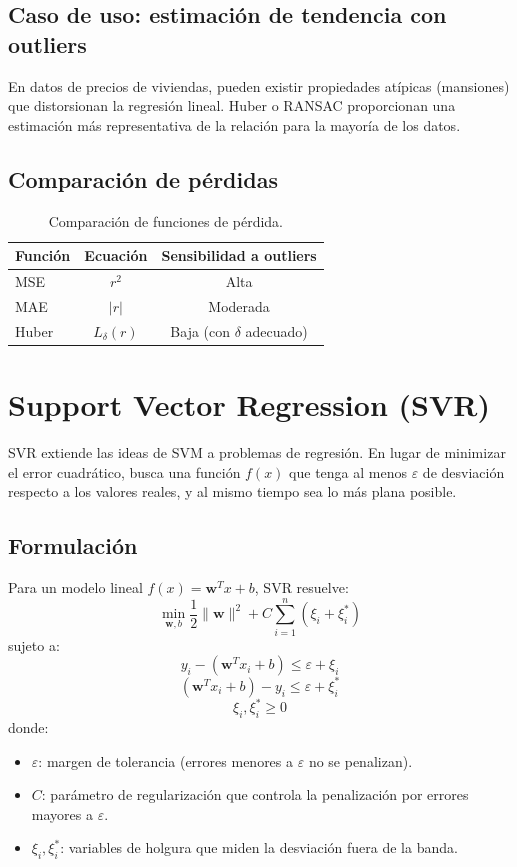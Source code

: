 \documentclass[12pt,a4paper,openany,oneside]{book}
\begin{document}
\subsection{Caso de uso: estimación de tendencia con outliers}
En datos de precios de viviendas, pueden existir propiedades atípicas (mansiones) que distorsionan la regresión lineal. Huber o RANSAC proporcionan una estimación más representativa de la relación para la mayoría de los datos.

\subsection{Comparación de pérdidas}
\begin{table}[h]
\centering
\begin{tabular}{|l|c|c|}
\hline
\textbf{Función} & \textbf{Ecuación} & \textbf{Sensibilidad a outliers} \\
\hline
MSE & \(r^2\) & Alta \\
MAE & \(|r|\) & Moderada \\
Huber & \(L_{\delta}(r)\) & Baja (con \(\delta\) adecuado) \\
\hline
\end{tabular}
\caption{Comparación de funciones de pérdida.}
\end{table}

\section{Support Vector Regression (SVR)}

SVR extiende las ideas de SVM a problemas de regresión. En lugar de minimizar el error cuadrático, busca una función \(f(x)\) que tenga al menos \(\varepsilon\) de desviación respecto a los valores reales, y al mismo tiempo sea lo más plana posible.

\subsection{Formulación}
Para un modelo lineal \(f(x) = \mathbf{w}^T x + b\), SVR resuelve:
\[
\min_{\mathbf{w}, b} \frac{1}{2} \|\mathbf{w}\|^2 + C \sum_{i=1}^n (\xi_i + \xi_i^*)
\]
sujeto a:
\[
y_i - (\mathbf{w}^T x_i + b) \le \varepsilon + \xi_i
\]
\[
(\mathbf{w}^T x_i + b) - y_i \le \varepsilon + \xi_i^*
\]
\[
\xi_i, \xi_i^* \ge 0
\]
donde:
\begin{itemize}
    \item \(\varepsilon\): margen de tolerancia (errores menores a \(\varepsilon\) no se penalizan).
    \item \(C\): parámetro de regularización que controla la penalización por errores mayores a \(\varepsilon\).
    \item \(\xi_i, \xi_i^*\): variables de holgura que miden la desviación fuera de la banda.
\end{itemize}
\end{document}
